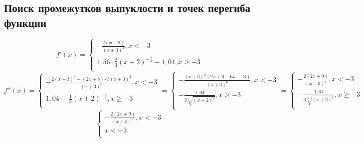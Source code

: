 \documentclass{article}
\begin{document}
    \subsection{Поиск промежутков выпуклости и точек перегиба функции}
    \begin{equation*}
    f'(x) = 
    \begin{cases}
        - \frac{2(x+8)}{(x+3)^3}, x < -3 \\
        1,56 \cdot \frac{2}{3}(x+2)^{-\frac{1}{3}} - 1,04, x \geq -3 \\
    \end{cases}
    \end{equation*}
    \begin{equation*}
    f''(x) = 
    \begin{cases}
        - \frac{2(x+3)^3 - (2x+8) \cdot 3(x+3)^2}{(x+3)^6}, x < -3 \\
        1,04 \cdot -\frac{1}{3}(x+2)^{-\frac{4}{3}}, x \geq -3 \\
    \end{cases}
    = 
    \begin{cases}
        - \frac{(x+3)^2(2x+6-6x-24)}{(x+3)^6}, x < -3 \\
        - \frac{1,04}{3 \sqrt[3]{(x+2)^4}}, x \geq -3 \\
    \end{cases}
    = 
    \begin{cases}
        - \frac{2(2x+9)}{(x+3)^4}, x < -3 \\
        - \frac{1,04}{3 \sqrt[3]{(x+2)^4}}, x \geq -3 \\
    \end{cases}
    \end{equation*}
    \begin{equation*}
    \begin{cases}
        - \frac{2(2x+9)}{(x+3)^4}, x < -3 \\
        x < -3 \\
    \end{cases}
    \end{equation*}
\end{document}
